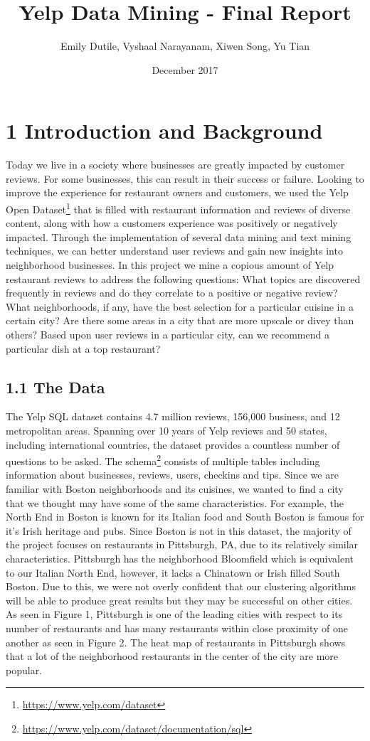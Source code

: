 \documentclass{neu_handout}
\title{Yelp Data Mining - Final Report}
\author{Emily Dutile, Vyshaal Narayanam, Xiwen Song, Yu Tian}
\date{December 2017}
\begin{document}
\section*{1 Introduction and Background}
Today we live in a society where businesses are greatly impacted by customer reviews. For some businesses, this can result in their success or failure. Looking to improve the
experience for restaurant owners and customers, we used the Yelp Open Dataset\footnote{\url{https://www.yelp.com/dataset}} that is filled with restaurant information and reviews of diverse content, along with how a customers experience was positively or negatively impacted. Through the implementation of several data mining and text mining techniques, we can better understand user reviews and gain new insights into neighborhood businesses. In this project we mine a copious amount of Yelp restaurant reviews to address the following questions: What topics are discovered frequently in reviews and do they correlate to a positive or negative review? What neighborhoods, if any, have the best selection for a particular cuisine in a certain city? Are there some areas in a city that are more upscale or divey than others? Based upon user reviews in a particular city, can we recommend a particular dish at a top restaurant?
\subsection*{1.1 The Data}
The Yelp SQL dataset contains 4.7 million reviews, 156,000 business, and 12 metropolitan areas. Spanning over 10 years of Yelp reviews and 50 states, including international countries, the dataset provides a countless number of questions to be asked. The schema\footnote{\url{https://www.yelp.com/dataset/documentation/sql}} consists of multiple tables including information about businesses, reviews, users, checkins and tips. Since we are familiar with Boston neighborhoods and its cuisines, we wanted to find a city that we thought may have some of the same characteristics. For example, the North End in Boston is known for its Italian food and South Boston is famous for it's Irish heritage and pubs. Since Boston is not in this dataset, the majority of the project focuses on restaurants in Pittsburgh, PA, due to its relatively similar characteristics. Pittsburgh has the neighborhood Bloomfield which is equivalent to our Italian North End, however, it lacks a Chinatown or Irish filled South Boston. Due to this, we were not overly confident that our clustering algorithms will be able to produce great results but they may be successful on other cities.
As seen in Figure 1, Pittsburgh is one of the leading cities with respect to its number of restaurants and has many restaurants within close proximity of one another as seen in Figure 2. The heat map of restaurants in Pittsburgh shows that a lot of the neighborhood restaurants in the center of the city are more popular.
\end{document}
